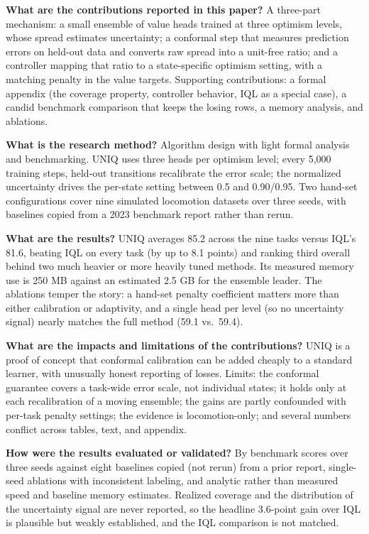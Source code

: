 \documentclass[11pt]{article}
\newcommand{\q}[2]{\item \textbf{#1} #2}
\begin{document}
\begin{qna}
\q{What are the contributions reported in this paper?}
A three-part mechanism: a small ensemble of value heads trained at three optimism levels, whose spread estimates uncertainty; a conformal step that measures prediction errors on held-out data and converts raw spread into a unit-free ratio; and a controller mapping that ratio to a state-specific optimism setting, with a matching penalty in the value targets. Supporting contributions: a formal appendix (the coverage property, controller behavior, IQL as a special case), a candid benchmark comparison that keeps the losing rows, a memory analysis, and ablations.

\q{What is the research method?}
Algorithm design with light formal analysis and benchmarking. UNIQ uses three heads per optimism level; every 5{,}000 training steps, held-out transitions recalibrate the error scale; the normalized uncertainty drives the per-state setting between 0.5 and 0.90/0.95. Two hand-set configurations cover nine simulated locomotion datasets over three seeds, with baselines copied from a 2023 benchmark report rather than rerun.

\q{What are the results?}
UNIQ averages 85.2 across the nine tasks versus IQL's 81.6, beating IQL on every task (by up to 8.1 points) and ranking third overall behind two much heavier or more heavily tuned methods. Its measured memory use is 250 MB against an estimated 2.5 GB for the ensemble leader. The ablations temper the story: a hand-set penalty coefficient matters more than either calibration or adaptivity, and a single head per level (so no uncertainty signal) nearly matches the full method (59.1 vs.\ 59.4).

\q{What are the impacts and limitations of the contributions?}
UNIQ is a proof of concept that conformal calibration can be added cheaply to a standard learner, with unusually honest reporting of losses. Limits: the conformal guarantee covers a task-wide error scale, not individual states; it holds only at each recalibration of a moving ensemble; the gains are partly confounded with per-task penalty settings; the evidence is locomotion-only; and several numbers conflict across tables, text, and appendix.

\q{How were the results evaluated or validated?}
By benchmark scores over three seeds against eight baselines copied (not rerun) from a prior report, single-seed ablations with inconsistent labeling, and analytic rather than measured speed and baseline memory estimates. Realized coverage and the distribution of the uncertainty signal are never reported, so the headline 3.6-point gain over IQL is plausible but weakly established, and the IQL comparison is not matched.


\end{qna}
\end{document}
